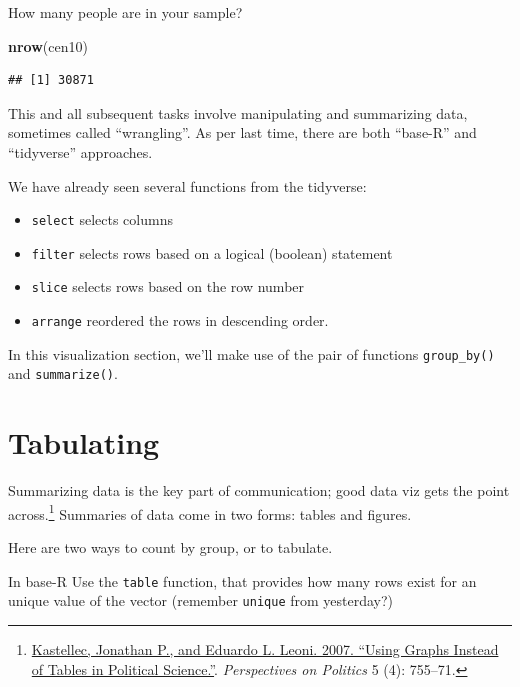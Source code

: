 \documentclass[
]{book}
\newenvironment{Shaded}{\begin{snugshade}}{\end{snugshade}}
\newcommand{\KeywordTok}[1]{\textcolor[rgb]{0.13,0.29,0.53}{\textbf{#1}}}
\newcommand{\NormalTok}[1]{#1}
\newcommand{\OperatorTok}[1]{\textcolor[rgb]{0.81,0.36,0.00}{\textbf{#1}}}
\providecommand{\tightlist}{%
  \setlength{\itemsep}{0pt}\setlength{\parskip}{0pt}}
\theoremstyle{definition}
\theoremstyle{definition}
\theoremstyle{definition}
\theoremstyle{definition}
\theoremstyle{remark}
\begin{document}
How many people are in your sample?

\begin{Shaded}
\begin{Highlighting}[]
\KeywordTok{nrow}\NormalTok{(cen10)}
\end{Highlighting}
\end{Shaded}

\begin{verbatim}
## [1] 30871
\end{verbatim}

This and all subsequent tasks involve manipulating and summarizing data, sometimes called ``wrangling''. As per last time, there are both ``base-R'' and ``tidyverse'' approaches.

We have already seen several functions from the tidyverse:

\begin{itemize}
\tightlist
\item
  \texttt{select} selects columns
\item
  \texttt{filter} selects rows based on a logical (boolean) statement
\item
  \texttt{slice} selects rows based on the row number
\item
  \texttt{arrange} reordered the rows in descending order.
\end{itemize}

In this visualization section, we'll make use of the pair of functions \texttt{group\_by()} and \texttt{summarize()}.

\hypertarget{tabulating}{%
\section{Tabulating}\label{tabulating}}

Summarizing data is the key part of communication; good data viz gets the point across.\footnote{\href{http://www.princeton.edu/~jkastell/Tables2Graphs/graphs.pdf}{Kastellec, Jonathan P., and Eduardo L. Leoni. 2007. ``Using Graphs Instead of Tables in Political Science.''}. \emph{Perspectives on Politics} 5 (4): 755--71.} Summaries of data come in two forms: tables and figures.

Here are two ways to count by group, or to tabulate.

In base-R Use the \texttt{table} function, that provides how many rows exist for an unique value of the vector (remember \texttt{unique} from yesterday?)

\begin{Shaded}
\end{Shaded}
\end{document}
